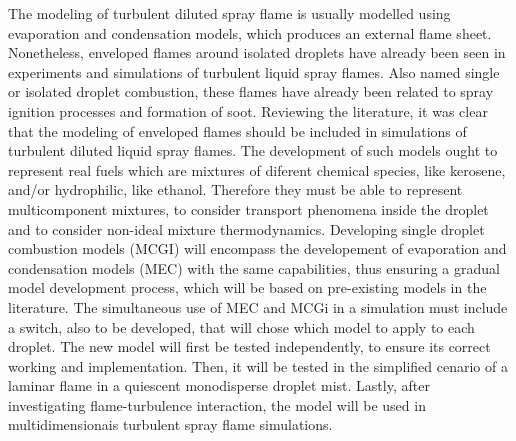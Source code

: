 {

\noindent
The modeling of turbulent diluted spray flame is usually modelled using evaporation and condensation models, which produces an external flame sheet.
Nonetheless, enveloped flames around isolated droplets have already been seen in experiments and simulations of turbulent liquid spray flames.
Also named single or isolated droplet combustion, these flames have already been related to spray ignition processes and formation of soot.
Reviewing the literature, it was clear that the modeling of enveloped flames should be included in simulations of turbulent diluted liquid spray flames. 
The development of such models ought to represent real fuels which are mixtures of diferent chemical species, like kerosene, and/or hydrophilic, like ethanol.  
Therefore they must be able to represent multicomponent mixtures, to consider transport phenomena inside the droplet and to consider non-ideal mixture thermodynamics.
Developing single droplet combustion models (MCGI) will encompass the developement of evaporation and condensation models (MEC) with the same capabilities, thus ensuring a gradual model development process, which will be based on pre-existing models in the literature.
The simultaneous use of MEC and MCGi in a simulation must include a switch, also to be developed, that will chose which model to apply to each droplet.
The new model will first be tested independently, to ensure its correct working and implementation.
Then, it will be tested in the simplified cenario of a laminar flame in a quiescent monodisperse droplet mist.
Lastly, after investigating flame-turbulence interaction, the model will be used in multidimensionais turbulent spray flame simulations.

}